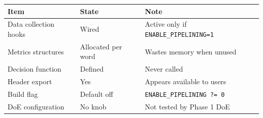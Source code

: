 \begin{tabular}{lll}
\toprule
Item & State & Note \\
\midrule
Data collection hooks & Wired & Active only if \texttt{ENABLE\_PIPELINING=1} \\
Metrics structures & Allocated per word & Wastes memory when unused \\
Decision function & Defined & Never called \\
Header export & Yes & Appears available to users \\
Build flag & Default off & \texttt{ENABLE\_PIPELINING ?= 0} \\
DoE configuration & No knob & Not tested by Phase 1 DoE \\
\bottomrule
\end{tabular}

